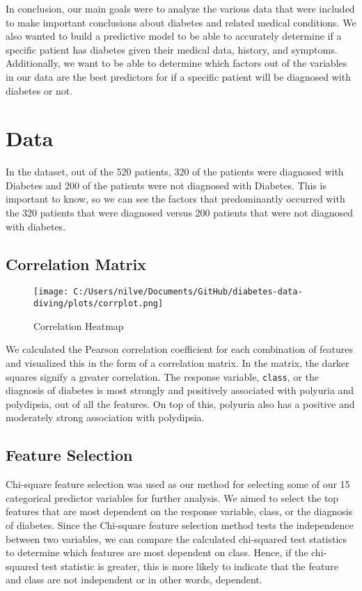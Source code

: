 \documentclass[
]{article}
\begin{document}
In conclusion, our main goals were to analyze the various data that were
included to make important conclusions about diabetes and related
medical conditions. We also wanted to build a predictive model to be
able to accurately determine if a specific patient has diabetes given
their medical data, history, and symptoms. Additionally, we want to be
able to determine which factors out of the variables in our data are the
best predictors for if a specific patient will be diagnosed with
diabetes or not.

\hypertarget{header-n819}{%
\section{Data}\label{header-n819}}

In the dataset, out of the 520 patients, 320 of the patients were
diagnosed with Diabetes and 200 of the patients were not diagnosed with
Diabetes. This is important to know, so we can see the factors that
predominantly occurred with the 320 patients that were diagnosed versus
200 patients that were not diagnosed with diabetes.

\hypertarget{header-n821}{%
\subsection{Correlation Matrix}\label{header-n821}}

\begin{figure}
\centering
\texttt{[image: C:/Users/nilve/Documents/GitHub/diabetes-data-diving/plots/corrplot.png]}
\caption{Correlation Heatmap}
\end{figure}

We calculated the Pearson correlation coefficient for each combination
of features and visualized this in the form of a correlation matrix. In
the matrix, the darker squares signify a greater correlation. The
response variable, \texttt{class}, or the diagnosis of diabetes is most
strongly and positively associated with polyuria and polydipsia, out of
all the features. On top of this, polyuria also has a positive and
moderately strong association with polydipsia.

\hypertarget{header-n824}{%
\subsection{Feature Selection}\label{header-n824}}

Chi-square feature selection was used as our method for selecting some
of our 15 categorical predictor variables for further analysis. We aimed
to select the top features that are most dependent on the response
variable, class, or the diagnosis of diabetes. Since the Chi-square
feature selection method tests the independence between two variables,
we can compare the calculated chi-squared test statistics to determine
which features are most dependent on class. Hence, if the chi-squared
test statistic is greater, this is more likely to indicate that the
feature and class are not independent or in other words, dependent.
\end{document}
